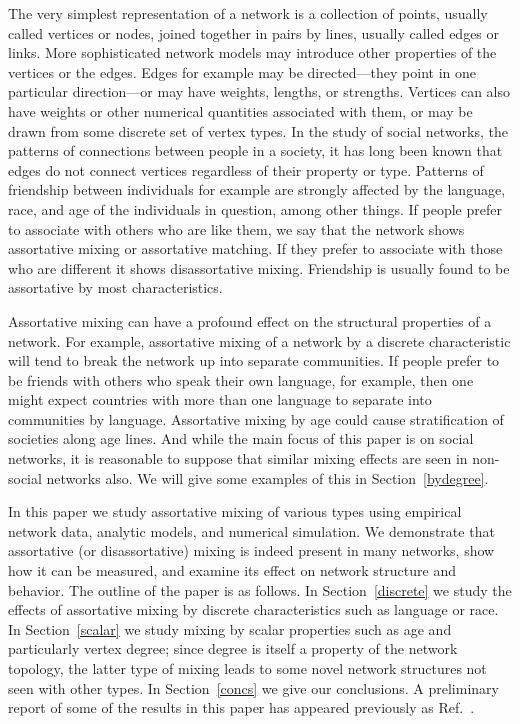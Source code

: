 \documentclass[twocolumn,pre]{revtex4}
\begin{document}
The very simplest representation of a network is a collection of points,
usually called vertices or nodes, joined together in pairs by lines,
usually called edges or links.  More sophisticated network models may
introduce other properties of the vertices or the edges.  Edges for example
may be directed---they point in one particular direction---or may have
weights, lengths, or strengths.  Vertices can also have weights or other
numerical quantities associated with them, or may be drawn from some
discrete set of vertex types.  In the study of social networks, the
patterns of connections between people in a society, it has long been known
that edges do not connect vertices regardless of their property or type.
Patterns of friendship between individuals for example are strongly
affected by the language, race, and age of the individuals in question,
among other things.  If people prefer to associate with others who are like
them, we say that the network shows assortative mixing or assortative
matching.  If they prefer to associate with those who are different it
shows disassortative mixing.  Friendship is usually found to be assortative
by most characteristics.

Assortative mixing can have a profound effect on the structural properties
of a network.  For example, assortative mixing of a network by a discrete
characteristic will tend to break the network up into separate communities.
If people prefer to be friends with others who speak their own language,
for example, then one might expect countries with more than one language to
separate into communities by language.  Assortative mixing by age could
cause stratification of societies along age lines.  And while the main
focus of this paper is on social networks, it is reasonable to suppose that
similar mixing effects are seen in non-social networks also.  We will give
some examples of this in Section~\ref{bydegree}.

In this paper we study assortative mixing of various types using empirical
network data, analytic models, and numerical simulation.  We demonstrate
that assortative (or disassortative) mixing is indeed present in many
networks, show how it can be measured, and examine its effect on network
structure and behavior.  The outline of the paper is as follows.  In
Section~\ref{discrete} we study the effects of assortative mixing by
discrete characteristics such as language or race.  In Section~\ref{scalar}
we study mixing by scalar properties such as age and particularly vertex
degree; since degree is itself a property of the network topology, the
latter type of mixing leads to some novel network structures not seen with
other types.  In Section~\ref{concs} we give our conclusions.  A
preliminary report of some of the results in this paper has appeared
previously as Ref.~.
\end{document}
